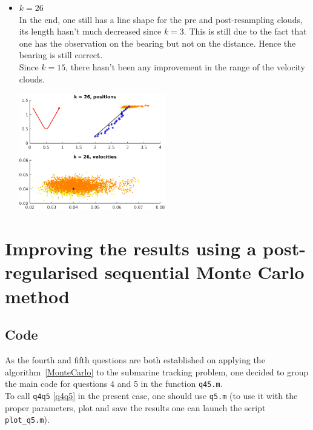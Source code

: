\documentclass[english,DIV=13]{scrreprt}
\begin{document}
\begin{itemize}
\begin{center}
\begin{minipage}{.5\textwidth}
	\end{minipage}
\end{center}
\item $k=26$\\
In the end, one still has a line shape for the pre and post-resampling clouds, its length hasn't much decreased
since $k=3$. This is still due to the fact that one has the observation on the bearing but not on the distance.
Hence the bearing is still correct.\\
Since $k=15$, there hasn't been any improvement in the range of the velocity clouds.

  \begin{center}
		 \includegraphics[width=0.5\textwidth]{img/q4_26.png}
\end{center}
  

\end{itemize} 

\chapter{Improving the results using a post-regularised sequential
Monte Carlo method}
\section*{Code}
As the fourth and fifth questions are both established on applying the algorithm~\ref{MonteCarlo}
to the submarine tracking problem, one decided to group the main code for questions 4 and 5
in the function \texttt{q45.m}.\\
To call \texttt{q4q5} \ref{q4q5} in the present case, one should use \texttt{q5.m} (to use it with the proper parameters,
plot and save the results one can launch the script \texttt{plot\_q5.m}).\\
%
\end{document}

